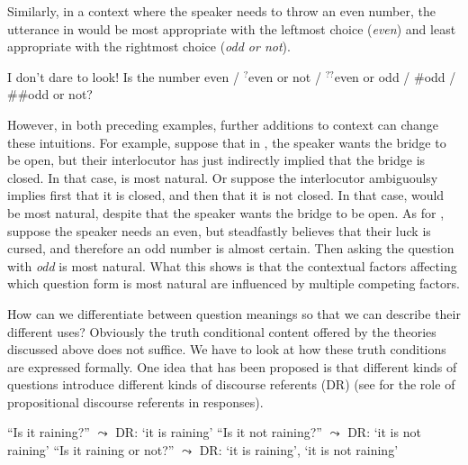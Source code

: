 \documentclass[output=paper,colorlinks,citecolor=brown]{langscibook}
\begin{document}
Similarly, in a context where the speaker needs to throw an even number, the utterance in  would be most appropriate with the leftmost choice (\textit{even}) and least appropriate with the rightmost choice (\textit{odd or not}). %

\ea\label{dice}
I don't dare to look! Is the number even  / $^{?}$even or not / $^{??}$even or odd / \#odd / \#\#odd or not?
\z

However, in both preceding examples, further additions to context can change these intuitions. For example, suppose that in , the speaker wants the bridge to be open, but their interlocutor has just indirectly implied that the bridge is closed. In that case,  is most natural. Or suppose the interlocutor ambiguoulsy implies first that it is closed, and then that it is not closed. In that case,  would be most natural, despite that the speaker wants the bridge to be open. As for , suppose the speaker needs an even, but steadfastly believes that their luck is cursed, and therefore an odd number is almost certain. Then asking the question with \textit{odd} is most natural. What this shows is that the contextual factors affecting which question form is most natural are  influenced by multiple competing factors. %

How can we differentiate between question meanings so that we can describe their different uses?  Obviously the truth conditional content offered by the theories discussed above does not suffice. We have to look at how these truth conditions are expressed formally. One idea that has been proposed is that different kinds of questions introduce different kinds of discourse referents (DR) (see \citealt{krifka2013} for the role of propositional discourse referents in responses). 

\ea\label{DRs}
\ea \label{rain} 
``Is it raining?'' \hfill $\leadsto$ DR: `it is raining'
\ex\label{notrain}
``Is it not raining?'' \hfill $\leadsto$ DR: `it is not raining'
\ex\label{rainornot}
``Is it raining or not?'' \hfill $\leadsto$ DR: `it is raining', `it is not raining'
\z
\z
\end{document}

